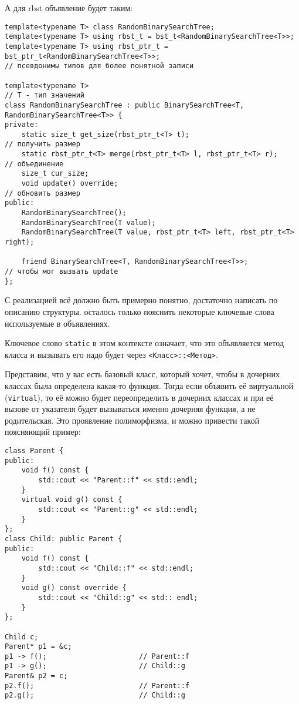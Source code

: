 А для rbst объявление будет таким:
\begin{verbatim}
template<typename T> class RandomBinarySearchTree;
template<typename T> using rbst_t = bst_t<RandomBinarySearchTree<T>>;
template<typename T> using rbst_ptr_t = bst_ptr_t<RandomBinarySearchTree<T>>;
// псевдонимы типов для более понятной записи

template<typename T>                                                        // T - тип значений
class RandomBinarySearchTree : public BinarySearchTree<T, RandomBinarySearchTree<T>> {
private:
    static size_t get_size(rbst_ptr_t<T> t);                                // получить размер
    static rbst_ptr_t<T> merge(rbst_ptr_t<T> l, rbst_ptr_t<T> r);           // объединение
    size_t cur_size;
    void update() override;                                                 // обновить размер
public:
    RandomBinarySearchTree();
    RandomBinarySearchTree(T value);
    RandomBinarySearchTree(T value, rbst_ptr_t<T> left, rbst_ptr_t<T> right);

    friend BinarySearchTree<T, RandomBinarySearchTree<T>>;                  // чтобы мог вызвать update
};
\end{verbatim}

С реализацией всё должно быть примерно понятно, достаточно написать по описанию структуры. осталось только пояснить некоторые ключевые слова используемые в объявлениях.

Ключевое слово \texttt{static} в этом контексте означает, что это объявляется метод класса и вызывать его надо будет через \texttt{<Класс>::<Метод>}.


Представим, что у вас есть базовый класс, который хочет, чтобы в дочерних классах была определена какая-то функция. Тогда если объявить её виртуальной (\texttt{virtual}), то её можно будет переопределить в дочерних классах и при её вызове от указателя будет вызываться именно дочерняя функция, а не родительская. Это проявление полиморфизма, и можно привести такой поясняющий пример:
\begin{verbatim}
class Parent {
public:
    void f() const {
        std::cout << "Parent::f" << std::endl;
    }
    virtual void g() const {
        std::cout << "Parent::g" << std::endl;
    }
};
class Child: public Parent {
public:
    void f() const {
        std::cout << "Child::f" << std::endl;
    }
    void g() const override {
        std::cout << "Child::g" << std:: endl;
    }
};

Child c;
Parent* p1 = &c;
p1 -> f();                      // Parent::f
p1 -> g();                      // Child::g
Parent& p2 = c;
p2.f();                         // Parent::f
p2.g();                         // Child::g
\end{verbatim}

